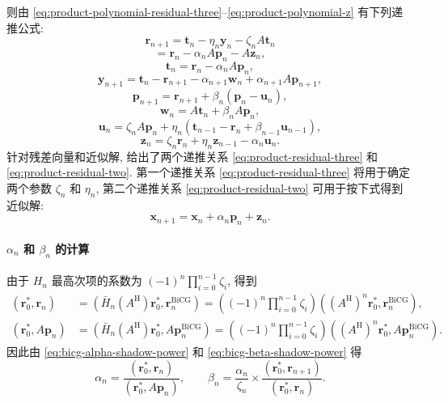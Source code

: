 {则由 \eqref{eq:product-polynomial-residual-three}--\eqref{eq:product-polynomial-z} 有下列递推公式:}
\begin{equation}\label{eq:product-residual-three}\bm r_{n+1}=\bm t_n-\eta_n\bm y_n-\zeta_nA\bm t_n\end{equation}
\begin{equation}\label{eq:product-residual-two}=\bm r_n-\alpha_nA\bm p_n-A\bm z_n,\end{equation}
\begin{equation}\label{eq:product-t}\bm t_n=\bm r_n-\alpha_nA\bm p_n,\end{equation}
\begin{equation}\label{eq:product-y}\bm y_{n+1}=\bm t_n-\bm r_{n+1}-\alpha_{n+1}\bm w_n+\alpha_{n+1}A\bm p_{n+1},\end{equation}
\begin{equation}\label{eq:product-p}\bm p_{n+1}=\bm r_{n+1}+\beta_n(\bm p_n-\bm u_n),\end{equation}
\begin{equation}\label{eq:product-w}\bm w_n=A\bm t_n+\beta_nA\bm p_n,\end{equation}
\begin{equation}\label{eq:product-u}\bm u_n=\zeta_nA\bm p_n+\eta_n(\bm t_{n-1}-\bm r_n+\beta_{n-1}\bm u_{n-1}),\end{equation}
\begin{equation}\label{eq:product-z}\bm z_n=\zeta_n\bm r_n+\eta_n\bm z_{n-1}-\alpha_n\bm u_n.\end{equation}
{针对残差向量和近似解, 给出了两个递推关系 \eqref{eq:product-residual-three} 和 \eqref{eq:product-residual-two}. 第一个递推关系 \eqref{eq:product-residual-three} 将用于确定两个参数 $\zeta_n$ 和 $\eta_n$, 第二个递推关系 \eqref{eq:product-residual-two} 可用于按下式得到近似解:}
\[\bm x_{n+1}=\bm x_n+\alpha_n\bm p_n+\bm z_n.\]
\paragraph{{$\alpha_n$ 和 $\beta_n$ 的计算}}\label{subsec:product-alpha-beta}\mbox{}\par
{由于 $H_n$ 最高次项的系数为 $(-1)^n\prod_{i=0}^{n-1}\zeta_i$, 得到}
\[\begin{aligned}(\bm r_0^{*},\bm r_n)&=(\bar H_n(A^{\mathrm H})\bm r_0^{*},\bm r_n^{\mathrm{BiCG}})=\left((-1)^n\prod_{i=0}^{n-1}\zeta_i\right)((A^{\mathrm H})^n\bm r_0^{*},\bm r_n^{\mathrm{BiCG}}),\\(\bm r_0^{*},A\bm p_n)&=(\bar H_n(A^{\mathrm H})\bm r_0^{*},A\bm p_n^{\mathrm{BiCG}})=\left((-1)^n\prod_{i=0}^{n-1}\zeta_i\right)((A^{\mathrm H})^n\bm r_0^{*},A\bm p_n^{\mathrm{BiCG}}).\end{aligned}\]
{因此由 \eqref{eq:bicg-alpha-shadow-power} 和 \eqref{eq:bicg-beta-shadow-power} 得}
\[\alpha_n=\frac{(\bm r_0^{*},\bm r_n)}{(\bm r_0^{*},A\bm p_n)},\qquad\beta_n=\frac{\alpha_n}{\zeta_n}\times\frac{(\bm r_0^{*},\bm r_{n+1})}{(\bm r_0^{*},\bm r_n)}.\]
